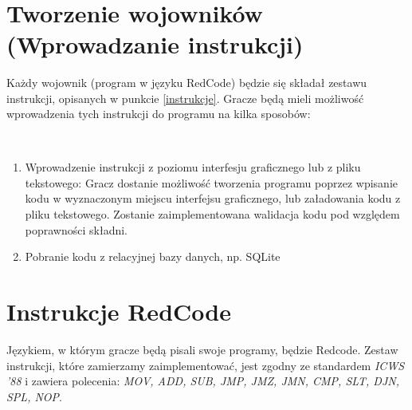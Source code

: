 \

\section{Tworzenie wojowników (Wprowadzanie instrukcji)}
Każdy wojownik (program w języku RedCode) będzie się składał zestawu instrukcji, opisanych w punkcie \ref{instrukcje}. Gracze będą mieli możliwość wprowadzenia tych instrukcji do programu na kilka sposobów:

\
\begin{enumerate}
	\item Wprowadzenie instrukcji z poziomu interfesju graficznego lub z pliku tekstowego:
	\newline
		Gracz dostanie możliwość tworzenia programu poprzez wpisanie kodu w wyznaczonym miejscu interfejsu graficznego, lub załadowania kodu z pliku tekstowego. Zostanie zaimplementowana walidacja kodu pod względem poprawności składni.
	
	\item Pobranie kodu z relacyjnej bazy danych, np. SQLite
\end{enumerate}

\section{Instrukcje RedCode}
Językiem, w którym gracze będą pisali swoje programy, będzie Redcode. Zestaw instrukcji, które zamierzamy zaimplementować, jest zgodny ze standardem \textit{ICWS '88} i zawiera polecenia: \textit{MOV, ADD, SUB, JMP, JMZ, JMN, CMP, SLT, DJN, SPL, NOP}.
\label{instrukcje}